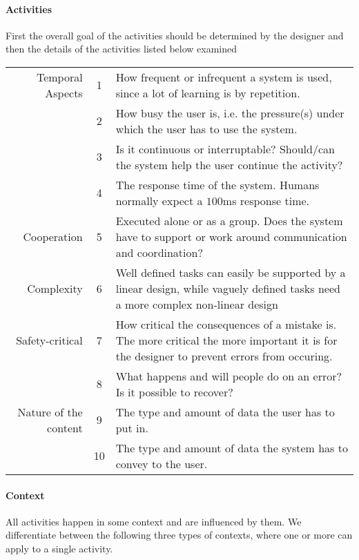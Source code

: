 \paragraph{Activities}
First the overall goal of the activities should be determined by the designer and then the details of the activities listed below examined  \cite[p. 33-35]{benyon14}

\noindent
\begin{longtable}{rc>{\raggedright\arraybackslash}p{}}
  Temporal Aspects
  &  1 & How frequent or infrequent a system is used, since a lot of learning is by repetition.
  \\
  &  2 & How busy the user is, i.e. the pressure(s) under which the user has to use the system.
  \\
  &  3 & Is it continuous or interruptable? Should/can the system help the user continue the activity?
  \\
  &  4 & The response time of the system. Humans normally expect a $100$ms response time.
  \\
  Cooperation
  &  5 & Executed alone or as a group. Does the system have to support or work around communication and coordination?
  \\
  Complexity
  &  6 & Well defined tasks can easily be supported by a linear design, while vaguely defined tasks need a more complex non-linear design
  \\
  Safety-critical
  &  7 & How critical the consequences of a mistake is. The more critical the more important it is for the designer to prevent errors from occuring.
  \\
  &  8 & What happens and will people do on an error? Is it possible to recover?
  \\
  Nature of the content
  &  9 & The type and amount of data the user has to put in.
  \\
  & 10 & The type and amount of data the system has to convey to the user.
\end{longtable}

\paragraph{Context}
All activities happen in some context and are influenced by them. We differentiate between the following three types of contexts, where one or more can apply to a single activity. \cite[p. 34-35]{benyon14}

